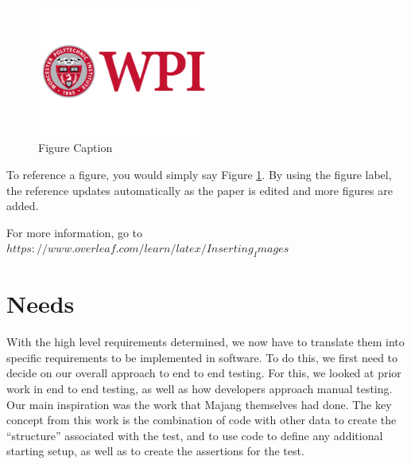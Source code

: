\documentclass{article}
\begin{document}
\begin{doublespacing}
\begin{figure}[h] %
    \centering
    \includegraphics[width=0.5\textwidth]{Images/logo.png} %
    \caption{Figure Caption} %
    \label{fig:label_of_figure} %
\end{figure}

\par To reference a figure, you would simply say Figure \ref{fig:label_of_figure}. By using the figure label, the reference updates automatically as the paper is edited and more figures are added.

 For more information, go to $https://www.overleaf.com/learn/latex/Inserting_Images$

\section{Needs}

With the high level requirements determined, we now have to translate them into specific requirements to be implemented in software. To do this, we first need to decide on our overall approach to end to end testing. For this, we looked at prior work in end to end testing, as well as how developers approach manual testing. Our main inspiration was the work that Majang themselves had done. The key concept from this work is the combination of code with other data to create the “structure” associated with the test, and to use code to define any additional starting setup, as well as to create the assertions for the test. 


\end{doublespacing}
\end{document}
